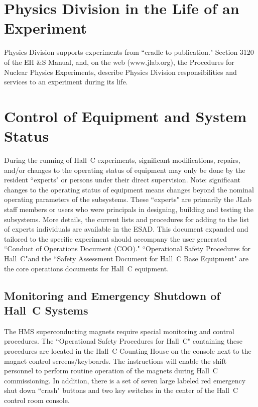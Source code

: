 \section{Physics Division in the Life of an Experiment}


Physics Division supports experiments from ``cradle to publication."
Section 3120 of the EH \&S Manual, and, on the web (www.jlab.org), the Procedures
for Nuclear Physics Experiments, describe Physics Division 
responsibilities and services to an
experiment during its life.

\section{Control of Equipment and System Status}


During the running of Hall~C experiments, significant
modifications, repairs, and/or changes to the operating status of equipment
may only be done by the
resident ``experts" or persons under their direct supervision. Note:
significant changes to the
operating status of equipment means changes beyond the nominal operating
parameters of the
subsystems. These ``experts" are primarily the JLab staff members or users
who were
principals in designing, building and testing the subsystems. More details,
the current lists and
procedures for adding to the list of experts individuals are available in
the ESAD. 
This document expanded and
tailored to the
specific experiment should accompany the user generated ``Conduct of
Operations Document
(COO)." ``Operational Safety Procedures for Hall~C"and the ``Safety
Assessment Document
for Hall~C Base Equipment"  are the core operations documents for Hall~C equipment.

\subsection{Monitoring and Emergency Shutdown of Hall~C Systems}


The HMS superconducting magnets require special monitoring and control
procedures.
The ``Operational Safety Procedures for Hall~C" containing these procedures
are located in the
Hall~C Counting House on the console next to the magnet control
screens/keyboards.   The instructions will enable the shift personnel
to perform routine
operation of the magnets during Hall~C commissioning. In addition, there
is a set of seven
large labeled red emergency shut down ``crash" buttons and two key switches
in the center of
the Hall~C control room console.


